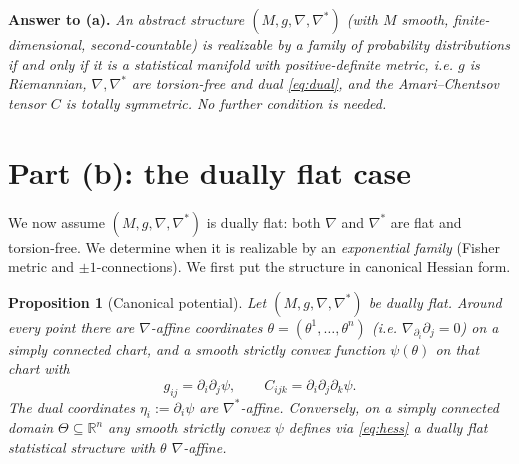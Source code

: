 \documentclass{amsart}
\newtheorem{proposition}{Proposition}
\theoremstyle{definition}
\theoremstyle{remark}
\begin{document}
\medskip
\noindent\textbf{Answer to (a).}
\emph{An abstract structure $(M,g,\nabla,\nabla^{*})$ (with $M$ smooth,
finite-dimensional, second-countable) is realizable by a family of probability
distributions if and only if it is a statistical manifold with positive-definite
metric, i.e. $g$ is Riemannian, $\nabla,\nabla^{*}$ are torsion-free and dual
\eqref{eq:dual}, and the Amari--Chentsov tensor $C$ is totally symmetric. No
further condition is needed.}

\section{Part (b): the dually flat case}

We now assume $(M,g,\nabla,\nabla^{*})$ is dually flat: both $\nabla$ and
$\nabla^{*}$ are flat and torsion-free. We determine when it is realizable by an
\emph{exponential family} (Fisher metric and $\pm1$-connections). We first put the
structure in canonical Hessian form.

\begin{proposition}[Canonical potential]\label{prop:hessian}
Let $(M,g,\nabla,\nabla^{*})$ be dually flat. Around every point there are
$\nabla$-affine coordinates $\theta=(\theta^{1},\dots,\theta^{n})$ (i.e.
$\nabla_{\partial_{i}}\partial_{j}=0$) on a simply connected chart, and a smooth
strictly convex function $\psi(\theta)$ on that chart with
\begin{equation}\label{eq:hess}
  g_{ij}=\partial_{i}\partial_{j}\psi,\qquad
  C_{ijk}=\partial_{i}\partial_{j}\partial_{k}\psi .
\end{equation}
The dual coordinates $\eta_{i}:=\partial_{i}\psi$ are $\nabla^{*}$-affine.
Conversely, on a simply connected domain $\Theta\subseteq\mathbb R^{n}$ any
smooth strictly convex $\psi$ defines via \eqref{eq:hess} a dually flat
statistical structure with $\theta$ $\nabla$-affine.
\end{proposition}
\end{document}
